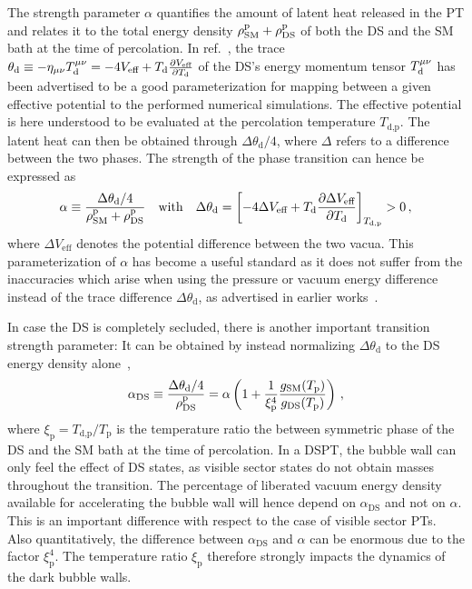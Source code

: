 The strength parameter $\alpha$  quantifies the amount of latent heat released in the \ac{PT} and relates it to the total energy density $\rho_\text{SM}^{\text{p}} + \rho_\text{DS}^{\text{p}}$ of both the \ac{DS} and the \ac{SM} bath at the time of percolation.  In ref.~\cite{Hindmarsh:2015qta}, the trace $\theta_\text{d} \equiv - \eta_{\mu \nu} T^{\mu \nu}_\text{d} = - 4  V_\text{eff} + T_\text{d} \frac{\partial V_\text{eff}}{\partial T_\text{d}}$ of the  \ac{DS}'s energy momentum tensor $T^{{\mu \nu}}_\text{d}$ has been advertised to be a good parameterization for mapping between a given effective potential to the performed numerical simulations. The effective potential is here understood to be evaluated at the percolation temperature $T_\text{d,p}$. The latent heat can then be obtained through $\Delta \theta_\text{d}/4$, where $\Delta$ refers to a difference between the two phases. The strength of the phase transition can hence be expressed as
\begin{align}
	\alpha \equiv \frac{\Delta \theta_\text{d} / 4}{\rho_\text{SM}^\text{p} +\rho_\text{DS}^\text{p}}  && \text{with} && \Delta \theta_\text{d} = \left[  - 4 \Delta V_\text{eff} + T_\text{d} \frac{\partial \Delta V_\text{eff}}{\partial T_\text{d}}  \right]_{T_{\text{d,p}}}  > 0 \, ,
	\label{eq:alpha}
\end{align}
where $\Delta V_\text{eff}$ denotes the potential difference between the two vacua. This parameterization of $\alpha$ has become a useful standard as it does not suffer from the inaccuracies which arise when using the pressure or vacuum energy difference instead of the trace difference $\Delta \theta_\text{d}$, as advertised in earlier works~\cite{Athron:2020maw, Giese:2020rtr}. 

In case the \ac{DS} is completely secluded, there is another important transition  strength parameter: It can be obtained by instead normalizing $\Delta \theta_\text{d}$ to the \ac{DS} energy density alone~\cite{Ertas:2021xeh, Bringmann:2023opz}, 
\begin{align}
	\alpha_\text{DS} \equiv \frac{\Delta \theta_\text{d}/4}{\rho_\text{DS}^\text{p}} = \alpha \left( 1 + \frac{1}{\xi_\text{p}^4 } \frac{g_{\text{SM}}(T_\text{p})}{g_{\text{DS}}(T_\text{p})} \right) \, , \label{eq:alphaDS}
\end{align}
where $\xi_\text{p} = T_\text{d,p}/T_\text{p}$ is the temperature ratio the between symmetric phase of the \ac{DS} and the \ac{SM} bath at the time of percolation. In a \ac{DSPT}, the bubble wall can only feel the effect of \ac{DS} states, as visible sector states do not obtain masses throughout the transition. The percentage of liberated vacuum energy density available for accelerating the bubble wall will hence depend on $\alpha_\text{DS}$ and not on $\alpha$. This is an important difference with respect to the case of visible sector \acp{PT}. Also quantitatively, the difference between $\alpha_\text{DS}$ and $\alpha$ can be enormous due to the factor $\xi_\text{p}^4$. The temperature ratio $\xi_\text{p}$ therefore strongly impacts the dynamics of the dark bubble walls. 

